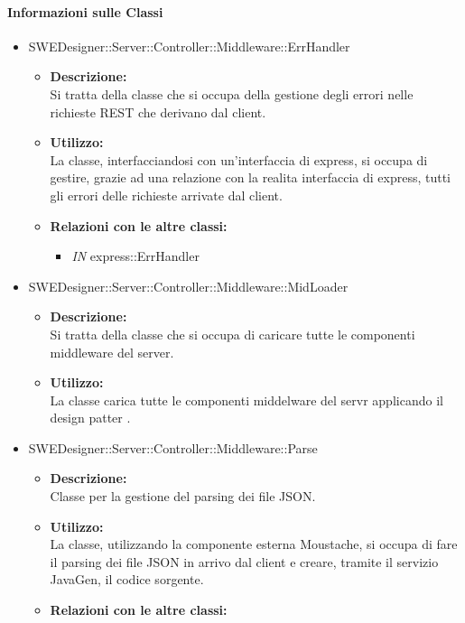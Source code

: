 		\paragraph{Informazioni sulle Classi}
		\begin{itemize}
			\item SWEDesigner::Server::Controller::Middleware::ErrHandler
			\begin{itemize}
				\item \textbf{Descrizione: }\\
				Si tratta della classe che si occupa della gestione degli errori nelle richieste REST che derivano dal client.
				\item \textbf{Utilizzo: }\\
				La classe, interfacciandosi con un'interfaccia di express, si occupa di gestire, grazie ad una relazione con la realita interfaccia di express, tutti gli errori delle richieste arrivate dal client.
				\item \textbf{Relazioni con le altre classi: }
				\begin{itemize}
					\item \emph{IN} express::ErrHandler
				\end{itemize}
			\end{itemize}
			\item SWEDesigner::Server::Controller::Middleware::MidLoader
			\begin{itemize}
				\item \textbf{Descrizione: }\\
				Si tratta della classe che si occupa di caricare tutte le componenti middleware del server.
				\item \textbf{Utilizzo: }\\
				La classe carica tutte le componenti middelware del servr applicando il design patter .
			\end{itemize}
			\item SWEDesigner::Server::Controller::Middleware::Parse
			\begin{itemize}
				\item \textbf{Descrizione: }\\
				Classe per la gestione del parsing dei file JSON.
				\item \textbf{Utilizzo: }\\
				La classe, utilizzando la componente esterna Moustache, si occupa di fare il parsing dei file JSON in arrivo dal client e creare, tramite il servizio JavaGen, il codice
				sorgente.
				\item \textbf{Relazioni con le altre classi: }

\end{itemize}
\end{itemize}
